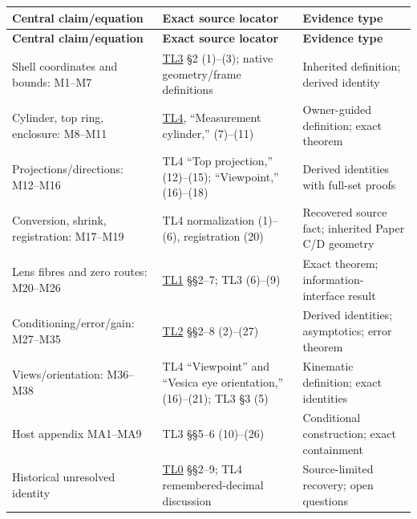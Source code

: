 \documentclass[11pt,a4paper]{article}
\begin{document}
\begingroup\small\setlength{\LTpre}{5pt}\setlength{\LTpost}{7pt}
\begin{longtable}{@{}>{\raggedright\arraybackslash}p{0.2500\dimexpr\textwidth-24pt\relax}>{\raggedright\arraybackslash}p{0.3700\dimexpr\textwidth-24pt\relax}>{\raggedright\arraybackslash}p{0.3800\dimexpr\textwidth-24pt\relax}@{}}
\toprule
\textbf{Central claim/\allowbreak{}equation} & \textbf{Exact source locator} & \textbf{Evidence type}\\ \midrule
\endfirsthead
\textbf{Central claim/\allowbreak{}equation} & \textbf{Exact source locator} & \textbf{Evidence type}\\ \midrule
\endhead
\bottomrule\endfoot
Shell coordinates and bounds: M1--M7 & \href{\detokenize{supplement/historical/TL3_vesica_containment_20261006/TL3_VESICA_3D_CONTAINMENT_SHELL.md}}{TL3} \S{}2 (1)--(3); native geometry/\allowbreak{}frame definitions & Inherited definition; derived identity\\[4pt]
Cylinder, top ring, enclosure: M8--M11 & \href{\detokenize{supplement/historical/TL4_measurement_frame_20261006/TL4_MEASUREMENT_CYLINDER_AND_DIRECTIONAL_FRAME.md}}{TL4}, \textquotedblleft{}Measurement cylinder,\textquotedblright{} (7)--(11) & Owner-guided definition; exact theorem\\[4pt]
Projections/\allowbreak{}directions: M12--M16 & TL4 \textquotedblleft{}Top projection,\textquotedblright{} (12)--(15); \textquotedblleft{}Viewpoint,\textquotedblright{} (16)--(18) & Derived identities with full-set proofs\\[4pt]
Conversion, shrink, registration: M17--M19 & TL4 normalization (1)--(6), registration (20) & Recovered source fact; inherited Paper C/\allowbreak{}D geometry\\[4pt]
Lens fibres and zero routes: M20--M26 & \href{\detokenize{supplement/historical/TL1_lens_srg_identifiability_20261006/TL1_LENS_SRG_INITIALIZER_IDENTIFIABILITY.md}}{TL1} \S{}\S{}2--7; TL3 (6)--(9) & Exact theorem; information-interface result\\[4pt]
Conditioning/\allowbreak{}error/\allowbreak{}gain: M27--M35 & \href{\detokenize{supplement/historical/TL2_lens_ratio_conditioning_20261006/TL2_CONDITIONING_OF_LENS_RATIO_RECOVERY.md}}{TL2} \S{}\S{}2--8 (2)--(27) & Derived identities; asymptotics; error theorem\\[4pt]
Views/\allowbreak{}orientation: M36--M38 & TL4 \textquotedblleft{}Viewpoint\textquotedblright{} and \textquotedblleft{}Vesica eye orientation,\textquotedblright{} (16)--(21); TL3 \S{}3 (5) & Kinematic definition; exact identities\\[4pt]
Host appendix MA1--MA9 & TL3 \S{}\S{}5--6 (10)--(26) & Conditional construction; exact containment\\[4pt]
Historical unresolved identity & \href{\detokenize{supplement/historical/TL0_top_layer_recovery_20261006/TL0_TOP_LAYER_CIRCLE_RECOVERY.md}}{TL0} \S{}\S{}2--9; TL4 remembered-decimal discussion & Source-limited recovery; open questions\\[4pt]
\end{longtable}\endgroup
\end{document}

